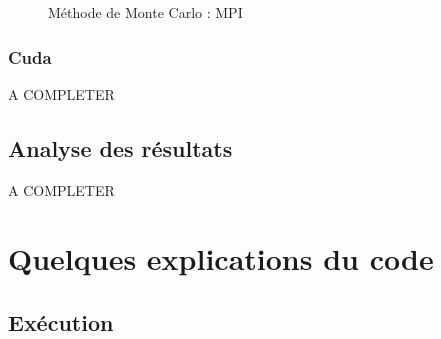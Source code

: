 \documentclass[10pt,a4paper]{article}
\begin{document}
\begin{figure}[ht!]
    \centering

    \hfill %
  
    \caption{Méthode de Monte Carlo : MPI}
    \label{fig:MCMPI}
  \end{figure}

\subsubsection{Cuda}

A COMPLETER


\subsection{Analyse des résultats} \label{sec:analyse}

A COMPLETER

\section{Quelques explications du code}


\subsection{Exécution}
\end{document}
